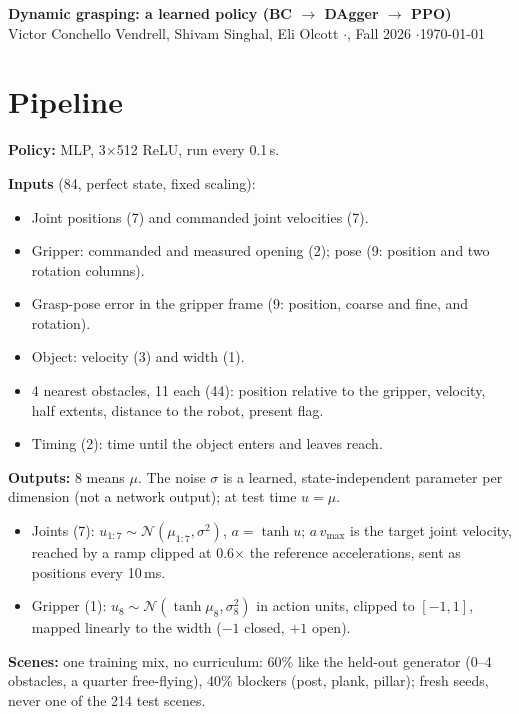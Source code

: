 \documentclass[11pt]{article}
\begin{document}
\begin{center}
  {\Large\bfseries Dynamic grasping: a learned policy (BC $\to$ DAgger $\to$ PPO)}\\[0.6ex]
  Victor Conchello Vendrell, Shivam Singhal, Eli Olcott \quad$\cdot$, Fall 2026 \quad$\cdot$\quad \today
\end{center}

\section{Pipeline}

\textbf{Policy:} MLP, 3$\times$512 ReLU, run every 0.1\,s.

\textbf{Inputs} (84, perfect state, fixed scaling):
\begin{itemize}
  \item Joint positions (7) and commanded joint velocities (7).
  \item Gripper: commanded and measured opening (2); pose (9: position and two rotation columns).
  \item Grasp-pose error in the gripper frame (9: position, coarse and fine, and rotation).
  \item Object: velocity (3) and width (1).
  \item 4 nearest obstacles, 11 each (44): position relative to the gripper, velocity, half extents, distance to the
    robot, present flag.
  \item Timing (2): time until the object enters and leaves reach.
\end{itemize}
\textbf{Outputs:} 8 means $\mu$. The noise $\sigma$ is a learned, state-independent parameter per dimension (not a
network output); at test time $u=\mu$.
\begin{itemize}
  \item Joints (7): $u_{1:7}\sim\mathcal N(\mu_{1:7},\sigma^2)$, $a=\tanh u$; $a\,v_{\max}$ is the target joint velocity,
    reached by a ramp clipped at 0.6$\times$ the reference accelerations, sent as positions every 10\,ms.
  \item Gripper (1): $u_8\sim\mathcal N(\tanh\mu_8,\sigma_8^2)$ in action units, clipped to $[-1,1]$, mapped linearly to
    the width ($-1$ closed, $+1$ open).
\end{itemize}
\textbf{Scenes:} one training mix, no curriculum: 60\% like the held-out generator (0--4 obstacles, a quarter
free-flying), 40\% blockers (post, plank, pillar); fresh seeds, never one of the 214 test scenes.
\end{document}
